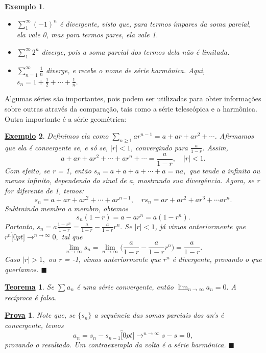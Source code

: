 \documentclass{article}
\newtheorem*{theorem*}{\underline{Teorema}}
\newtheorem{example}{\underline{Exemplo}}
\newtheorem*{proof*}{\underline{Prova}}
\renewcommand\qedsymbol{$\blacksquare$}
\begin{document}
  \begin{example}
   \begin{itemize}
     \item[i)]$\sum\limits_{1}^{\infty}(-1)^{n}$ \'e divergente, visto que, para termos \'impares da soma parcial, ela vale 0, mas para termos pares,
    ela vale 1.
     \item[ii)]$\sum\limits_{1}^{\infty}2^{n}$ diverge, pois a soma parcial dos termos dela n\~ao \'e limitada.
     \item[iii)]$\sum\limits_{n=1}^{\infty}\frac{1}{n}$ diverge, e recebe o nome de s\'erie harm\^onica. Aqui, $s_{n} = 1 + \frac{1}{2}+\cdots+\frac{1}{n}.$
   \end{itemize}
  \end{example}
  Algumas s\'eries s\~ao importantes, pois podem ser utilizadas para obter informa\c c\~oes sobre outras atrav\'es da compara\c c\~ao, tais como a 
  s\'erie telesc\'opica e a harm\^onica. Outra importante \'e a s\'erie geom\'etrica:
 \begin{example}
   Definimos ela como $\sum\limits_{n\geq{1}}^{}ar^{n-1} = a + ar + ar^{2} + \cdots$. Afirmamos que ela \'e convergente se, e s\'o se,
  $|r| < 1$, convergindo para $\frac{a}{1-r}$. Assim, 
    $$
      a + ar + ar^{2} + \cdots + ar^{n} + \cdots = \frac{a}{1-r}, \quad |r| < 1.
    $$
    Com efeito, se r = 1, ent\~ao $s_{n} = a + a + a + \cdots + a = na,$ que tende a infinito ou menos infinito, dependendo do sinal de a, mostrando sua diverg\^encia.
Agora, se r for diferente de 1, temos: 
  $$
    s_{n} = a + ar + ar^{2} + \cdots + ar^{n-1},\quad rs_{n} = ar + ar^{2} + ar^{3} + \cdots ar^{n}.
  $$
  Subtraindo membro a membro, obtemos 
    $$
      s_{n}(1-r) = a - ar^{n} = a(1-r^{n}).
    $$
    Portanto, $s_{n} = a \frac{1-r^{n}}{1-r} = \frac{a}{1-r} - \frac{a}{1-r}r^{n}.$ Se $|r|<1$, j\'a vimos anteriormente que
  $r^{n}\overbracket[0pt]{\longrightarrow}^{n\to \infty}0,$ tal que 
    $$
      \lim_{n\to\infty}s_{n} = \lim_{n\to\infty}\biggl(\frac{a}{1-r} - \frac{a}{1-r}r^{n}\biggr) = \frac{a}{1-r}.
    $$
    Caso $|r| > 1,$ ou r = -1, vimos anteriormente que $r^{n}$ \'e divergente, provando o que quer\'iamos. \qedsymbol
 \end{example}
\begin{theorem*}
  Se $\sum\limits_{}^{}a_{n}$ \'e uma s\'erie convergente, ent\~ao $\lim_{n\to\infty}a_{n} = 0.$ A rec\'iproca \'e falsa.
\end{theorem*}
\begin{proof*}
  Note que, se $\{s_{n}\}$ a sequ\^encia das somas parciais dos an's \'e convergente, temos 
    $$
      a_{n} = s_{n} - s_{n-1}\overbracket[0pt]{\longrightarrow}^{n\to \infty} s-s= 0,
    $$
    provando o resultado. Um contraexemplo da volta \'e a s\'erie harm\^onica. \qedsymbol
\end{proof*}
\end{document}

